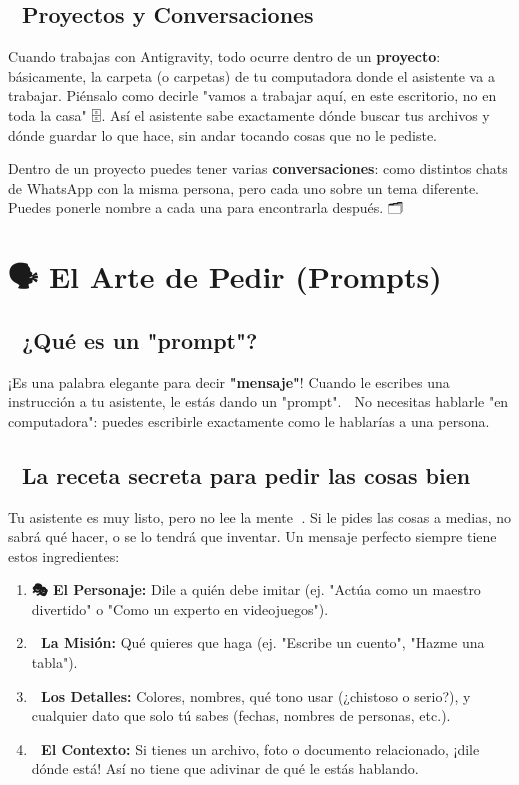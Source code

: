 \documentclass[12pt]{article}
\begin{document}
\subsection{📁 Proyectos y Conversaciones}
Cuando trabajas con Antigravity, todo ocurre dentro de un \textbf{proyecto}: básicamente, la carpeta (o carpetas) de tu computadora donde el asistente va a trabajar. Piénsalo como decirle "vamos a trabajar aquí, en este escritorio, no en toda la casa" 🗄️. Así el asistente sabe exactamente dónde buscar tus archivos y dónde guardar lo que hace, sin andar tocando cosas que no le pediste.

Dentro de un proyecto puedes tener varias \textbf{conversaciones}: como distintos chats de WhatsApp con la misma persona, pero cada uno sobre un tema diferente. Puedes ponerle nombre a cada una para encontrarla después. 🗂️

\newpage
\section{🗣️ El Arte de Pedir (Prompts)}

\subsection{🤔 ¿Qué es un "prompt"?}
¡Es una palabra elegante para decir \textbf{"mensaje"}! Cuando le escribes una instrucción a tu asistente, le estás dando un "prompt". 📝 No necesitas hablarle "en computadora": puedes escribirle exactamente como le hablarías a una persona.

\subsection{🍰 La receta secreta para pedir las cosas bien}
Tu asistente es muy listo, pero no lee la mente 🧠. Si le pides las cosas a medias, no sabrá qué hacer, o se lo tendrá que inventar. Un mensaje perfecto siempre tiene estos ingredientes:

\begin{enumerate}
    \item \textbf{🎭 El Personaje:} Dile a quién debe imitar (ej. "Actúa como un maestro divertido" o "Como un experto en videojuegos").
    \item \textbf{🎯 La Misión:} Qué quieres que haga (ej. "Escribe un cuento", "Hazme una tabla").
    \item \textbf{🎨 Los Detalles:} Colores, nombres, qué tono usar (¿chistoso o serio?), y cualquier dato que solo tú sabes (fechas, nombres de personas, etc.).
    \item \textbf{📎 El Contexto:} Si tienes un archivo, foto o documento relacionado, ¡dile dónde está! Así no tiene que adivinar de qué le estás hablando.
\end{enumerate}
\end{document}
